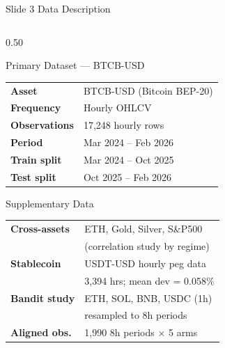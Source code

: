 \documentclass[aspectratio=169, 10pt]{beamer}
\newcommand{\blu}[1]{{\color{accentblue}#1}}
\begin{document}
\begin{frame}[t]{Slide 3 \quad Data Description}
\vspace{2pt}
\begin{columns}[T]

  \begin{column}{0.50\textwidth}
    \begin{block}{Primary Dataset --- BTCB-USD}
    \vspace{2pt}
    \small
    \begin{tabular}{>{\bfseries}p{2.5cm} p{3.8cm}}
      Asset       & BTCB-USD (Bitcoin BEP-20) \\
      Frequency   & Hourly OHLCV \\
      Observations & \blu{17,248} hourly rows \\
      Period      & Mar 2024 -- Feb 2026 \\
      Train split & Mar 2024 -- Oct 2025 \\
      Test split  & Oct 2025 -- Feb 2026 \\
    \end{tabular}
    \vspace{2pt}
    \end{block}

    \vspace{4pt}
    \begin{block}{Supplementary Data}
    \vspace{2pt}
    \small
    \begin{tabular}{>{\bfseries}p{2.5cm} p{3.8cm}}
      Cross-assets & ETH, Gold, Silver, S\&P500 \\
                   & (correlation study by regime) \\
      Stablecoin   & USDT-USD hourly peg data\\
                   & 3,394 hrs; mean dev = 0.058\% \\
      Bandit study & ETH, SOL, BNB, USDC (1h) \\
                   & resampled to 8h periods \\
      Aligned obs. & \blu{1,990} 8h periods $\times$ 5 arms \\
    \end{tabular}
    \vspace{2pt}
    \end{block}
  \end{column}


\end{columns}
\end{frame}
\end{document}
